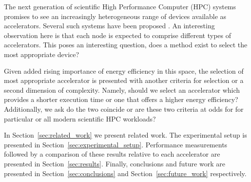 \documentclass[../document.tex]{subfiles}
\begin{document}
\label{sec:introduction}

The next generation of scientific High Performance Computer (HPC) systems promises to see an increasingly heterogeneous range of devices available as accelerators.
Several such systems have been proposed .
An interesting observation here is that each node is expected to comprise different types of accelerators.
This poses an interesting question, does a method exist to select the most appropriate device?


Given added rising importance of energy efficiency in this space, the selection of most appropriate accelerator is presented with another criteria for selection or a second dimension of complexity.
Namely, should we select an accelerator which provides a shorter execution time or one that offers a higher energy efficiency?
Additionally, we ask do the two coincide or are these two criteria at odds for for particular or all modern scientific HPC workloads?

In Section~\ref{sec:related_work} we present related work.
The experimental setup is presented in Section~\ref{sec:experimental_setup}.
Performance measurements followed by a comparison of these results relative to each accelerator are presented in Section~\ref{sec:results}.
Finally, conclusions and future work are presented in Section~\ref{sec:conclusions} and Section~\ref{sec:future_work} respectively.
\end{document}
